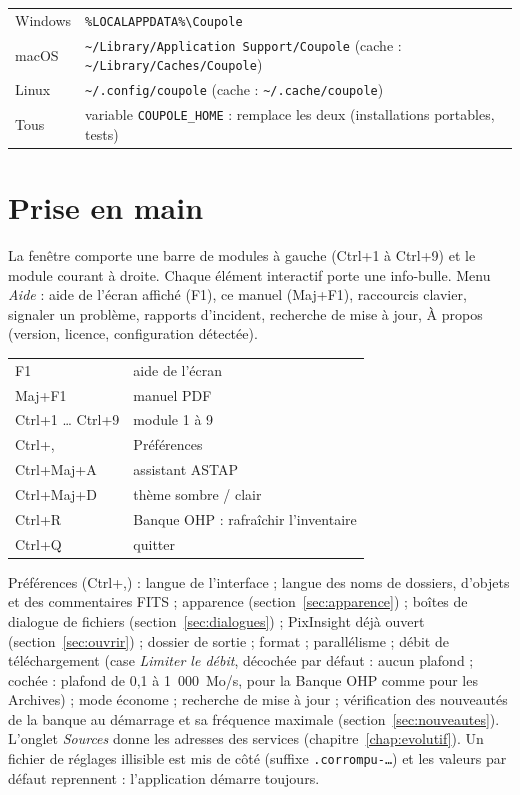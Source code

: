 \begin{center}\small
\begin{tabular}{@{}ll@{}}
\toprule
Windows & \texttt{\%LOCALAPPDATA\%\textbackslash Coupole}\\
macOS & \texttt{\textasciitilde/Library/Application Support/Coupole} (cache : \texttt{\textasciitilde/Library/Caches/Coupole})\\
Linux & \texttt{\textasciitilde/.config/coupole} (cache : \texttt{\textasciitilde/.cache/coupole})\\
Tous & variable \texttt{COUPOLE\_HOME} : remplace les deux (installations portables, tests)\\
\bottomrule
\end{tabular}
\end{center}

\section{Prise en main}
La fenêtre comporte une barre de modules à gauche (Ctrl+1 à Ctrl+9) et le module courant à droite. Chaque élément
interactif porte une info-bulle. Menu \emph{Aide} : aide de l'écran affiché (F1), ce manuel (Maj+F1), raccourcis
clavier, signaler un problème, rapports d'incident, recherche de mise à jour, À propos (version, licence,
configuration détectée).

\begin{center}\small
\begin{tabular}{@{}ll@{}}
\toprule
F1 & aide de l'écran\\ Maj+F1 & manuel PDF\\ Ctrl+1 … Ctrl+9 & module 1 à 9\\ Ctrl+, & Préférences\\
Ctrl+Maj+A & assistant ASTAP\\ Ctrl+Maj+D & thème sombre / clair\\ Ctrl+R & Banque OHP : rafraîchir l'inventaire\\ Ctrl+Q & quitter\\
\bottomrule
\end{tabular}
\end{center}

Préférences (Ctrl+,) : langue de l'interface ; langue des noms de dossiers, d'objets et des commentaires FITS ;
apparence (section~\ref{sec:apparence}) ; boîtes de dialogue de fichiers (section~\ref{sec:dialogues}) ; PixInsight déjà ouvert (section~\ref{sec:ouvrir}) ; dossier de sortie ; format ; parallélisme ; débit de téléchargement (case \emph{Limiter le débit}, décochée par défaut : aucun plafond ; cochée : plafond de 0,1 à 1~000~Mo/s, pour la Banque OHP comme pour les Archives) ; mode économe ; recherche de mise à jour ; vérification des nouveautés de la banque au démarrage et sa fréquence maximale (section~\ref{sec:nouveautes}). L'onglet
\emph{Sources} donne les adresses des services (chapitre~\ref{chap:evolutif}). Un fichier de réglages illisible est
mis de côté (suffixe \texttt{.corrompu-…}) et les valeurs par défaut reprennent : l'application démarre toujours.

